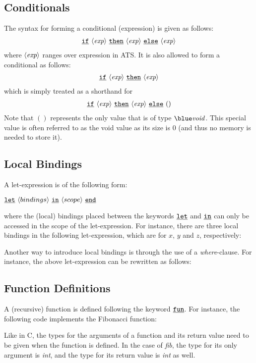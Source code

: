 \subsection{Conditionals}
The syntax for forming a conditional (expression) is given as follows:
\[\begin{array}{c}
\underline{\texttt{if}}~\langle\mbox{\it exp}\rangle~\underline{\texttt{then}}~\langle\mbox{\it exp}\rangle~\underline{\texttt{else}}~\langle\mbox{\it exp}\rangle
\end{array}\]
where $\langle\mbox{\it exp}\rangle$ ranges over expression in ATS. It is also
allowed to form a conditional as follows:
\[\begin{array}{c}
\underline{\texttt{if}}~\langle\mbox{\it exp}\rangle~\underline{\texttt{then}}~\langle\mbox{\it exp}\rangle
\end{array}\]
which is simply treated as a shorthand for
\[\begin{array}{c}
\underline{\texttt{if}}~\langle\mbox{\it exp}\rangle~\underline{\texttt{then}}~\langle\mbox{\it exp}\rangle~\underline{\texttt{else}}~()
\end{array}\]
Note that $()$ represents the only value that is of type ${\it\blue
void}$. This special value is often referred to as the void value as its
size is $0$ (and thus no memory is needed to store it).

\subsection{Local Bindings}
A let-expression is of the following form:
\begin{center}
\mbox{$\underline{\texttt{let}}~\langle bindings\rangle~\underline{\texttt{in}}~\langle scope\rangle~\underline{\texttt{end}}$}
\end{center}
where the (local) bindings placed between the keywords $\underline{\texttt{let}}$ and $\underline{\texttt{in}}$
can only be accessed in the scope of the let-expression. For instance,
there are three local bindings in the following let-expression, which are for
$x$, $y$ and $z$, respectively:

Another way to introduce local bindings is through the use of a {\it
where}-clause. For instance, the above let-expression can be rewritten as
follows:


\subsection{Function Definitions}

A (recursive) function is defined following the keyword $\underline{\texttt{fun}}$.
For instance, the following code implements the Fibonacci function:

Like in C, the types for the arguments of a function and its return value
need to be given when the function is defined. In the case of {\it fib},
the type for its only argument is {\it\blue int}, and the type for its
return value is {\it\blue int} as well.

